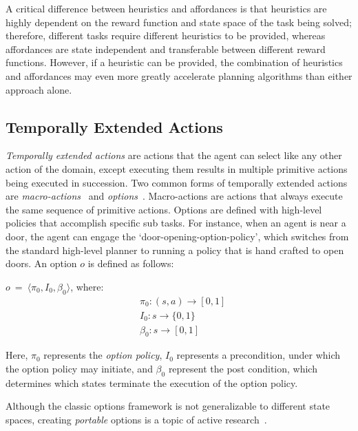 \documentclass[]{article}
\newcommand{\jmnote}[1]{\textcolor{Green}{\textbf{JM: #1}}}
\begin{document}
A critical difference between heuristics and affordances is that heuristics are highly dependent on the reward function and state space of the task being solved; therefore, different tasks require different heuristics to be provided, whereas affordances are state independent and transferable between different reward functions. However, if a heuristic can be provided, the combination of heuristics and affordances may even more greatly accelerate planning algorithms than either approach alone.


\subsection{Temporally Extended Actions}

{\em Temporally extended actions} are actions that the agent can
select like any other action of the domain, except executing them
results in multiple primitive actions being executed in
succession. Two common forms of temporally extended actions are {\em
  macro-actions}%
  ~and {\em
  options}~\citep{sutton99}. Macro-actions are actions that always
execute the same sequence of primitive actions. Options are defined
with high-level policies that accomplish specific sub tasks. For
instance, when an agent is near a door, the agent can engage the
`door-opening-option-policy', which switches from the standard
high-level planner to running a policy that is hand crafted to open
doors. An option $o$ is defined as follows:

$o\ =\ \langle \pi_0, I_0, \beta_0\rangle$, where:
\begin{align*}
&\pi_0 : (s,a) \rightarrow [0,1] \\
&I_0 : s \rightarrow \{0,1\} \\
&\beta_0 : s \rightarrow [0,1]
\end{align*}

Here, $\pi_0$ represents the {\it option policy}, $I_0$ represents
a precondition, under which the option policy may initiate, and 
$\beta_0$ represent the post condition, which determines which 
states terminate the execution of the option policy.

Although the classic options framework is not generalizable to different state spaces,
creating {\em portable} options is a topic of active research~\citep{konidaris07,konidaris2009efficient,Ravindran03analgebraic,croonenborghs2008learning,andre2002state,konidaris2012transfer}.
\end{document}
